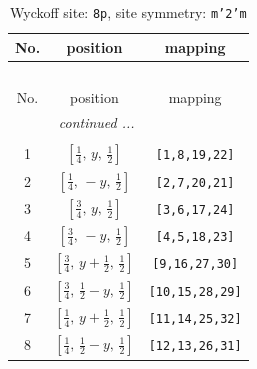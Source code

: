 \documentclass[fleqn,8pt]{jsarticle}
\begin{document}
\begin{longtable}{ccc}
\caption{Wyckoff site: {\tt 8p}, site symmetry: {\tt m'2'm}}
 \\
 \hline \hline
No. & position & mapping \\ \hline \endfirsthead

\multicolumn{2}{l}{\tablename\ \thetable{}} \\
 \hline \hline
No. & position & mapping \\ \hline \endhead

 \hline \hline
\multicolumn{2}{r}{\footnotesize\it continued ...} \\ \endfoot

 \hline \hline
\multicolumn{2}{r}{} \\ \endlastfoot

1 & $\left[ \frac{1}{4},\, y,\, \frac{1}{2} \right]$ & {\tt [1,8,19,22]} \\ \hline
2 & $\left[ \frac{1}{4},\, - y,\, \frac{1}{2} \right]$ & {\tt [2,7,20,21]} \\ \hline
3 & $\left[ \frac{3}{4},\, y,\, \frac{1}{2} \right]$ & {\tt [3,6,17,24]} \\ \hline
4 & $\left[ \frac{3}{4},\, - y,\, \frac{1}{2} \right]$ & {\tt [4,5,18,23]} \\ \hline
5 & $\left[ \frac{3}{4},\, y + \frac{1}{2},\, \frac{1}{2} \right]$ & {\tt [9,16,27,30]} \\ \hline
6 & $\left[ \frac{3}{4},\, \frac{1}{2} - y,\, \frac{1}{2} \right]$ & {\tt [10,15,28,29]} \\ \hline
7 & $\left[ \frac{1}{4},\, y + \frac{1}{2},\, \frac{1}{2} \right]$ & {\tt [11,14,25,32]} \\ \hline
8 & $\left[ \frac{1}{4},\, \frac{1}{2} - y,\, \frac{1}{2} \right]$ & {\tt [12,13,26,31]} \\
\end{longtable}
\renewcommand{\arraystretch}{1.2}
\end{document}
